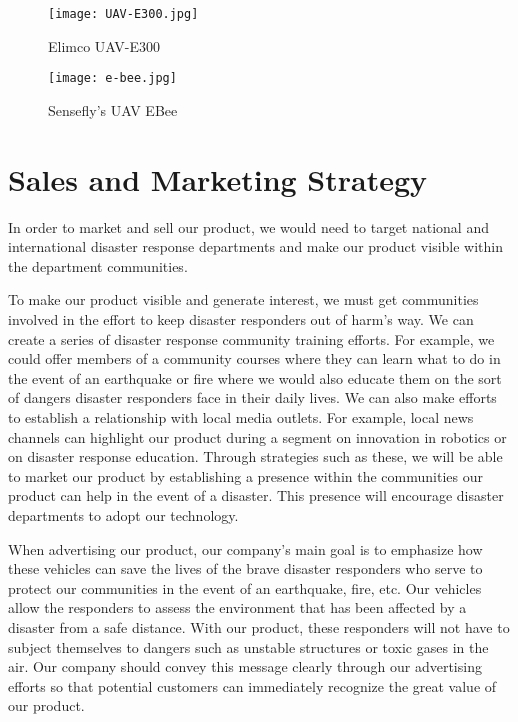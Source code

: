 \begin{figure}[H]
	\centering
	\texttt{[image: UAV-E300.jpg]}
	\caption{Elimco UAV-E300}
	\label{fig:ElimcoUAVE300}
\end{figure}

\begin{figure}[H]
	\centering
	\texttt{[image: e-bee.jpg]}
	\caption{Sensefly's UAV EBee}
	\label{fig:SenseflyEBee}
\end{figure}

\section{Sales and Marketing Strategy}

In order to market and sell our product, we would need to target national and international disaster response departments and make our product visible within the department communities. 

To make our product visible and generate interest, we must get communities involved in the effort to keep disaster responders out of harm's way. We can create a series of disaster response community training efforts. For example, we could offer members of a community courses where they can learn what to do in the event of an earthquake or fire where we would also educate them on the sort of dangers disaster responders face in their daily lives. We can also make efforts to establish a relationship with local media outlets. For example, local news channels can highlight our product during a segment on innovation in robotics or on disaster response education. Through strategies such as these, we will be able to market our product by establishing a presence within the communities our product can help in the event of a disaster. This presence will encourage disaster departments to adopt our technology. 

When advertising our product, our company's main goal is to emphasize how these vehicles can save the lives of the brave disaster responders who serve to protect our communities in the event of an earthquake, fire, etc. Our vehicles allow the responders to assess the environment that has been affected by a disaster from a safe distance. With our product, these responders will not have to subject themselves to dangers such as unstable structures or toxic gases in the air. Our company should convey this message clearly through our advertising efforts so that potential customers can immediately recognize the great value of our product. 

